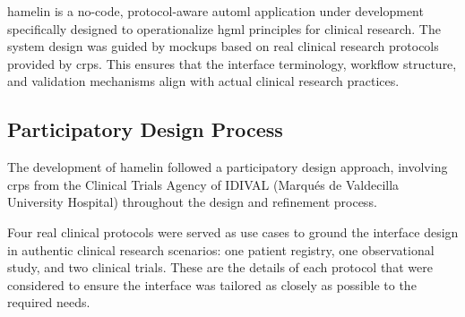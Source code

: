\documentclass[conference,onecolumn]{IEEEtran}
\begin{document}
\gls{hamelin} is a no-code, protocol-aware \gls{automl} application under development specifically designed to operationalize \gls{hgml} principles for clinical research. The system design was guided by mockups based on real clinical research protocols provided by \glspl{crp}. This ensures that the interface terminology, workflow structure, and validation mechanisms align with actual clinical research practices.

\subsection{Participatory Design Process}  
\label{subsec:design_process}  
  
The development of \gls{hamelin} followed a participatory design approach,   
involving \glspl{crp} from the Clinical Trials Agency of IDIVAL (Marqu\'es de Valdecilla University Hospital) throughout the design and refinement process.  
  
Four real clinical protocols were served as use cases to ground the interface design in authentic clinical research scenarios: one patient registry, one observational study, and two clinical trials. These are the details of each protocol that were considered to ensure the interface was tailored as closely as possible to the required needs.
  
\end{document}

